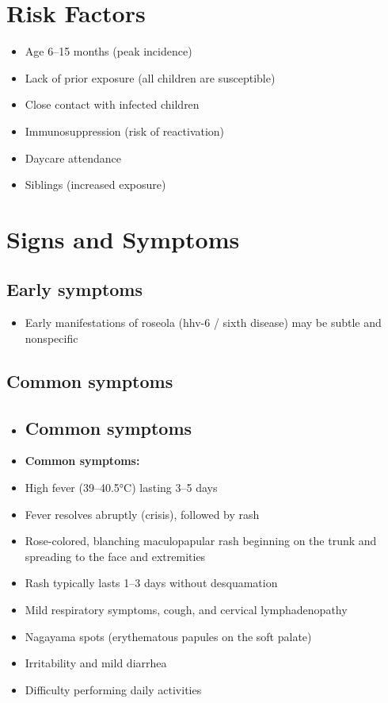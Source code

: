 \section{Risk Factors}

\begin{itemize}[noitemsep]
  \item Age 6--15 months (peak incidence)
  \item Lack of prior exposure (all children are susceptible)
  \item Close contact with infected children
  \item Immunosuppression (risk of reactivation)
  \item Daycare attendance
  \item Siblings (increased exposure)
\end{itemize}

\section{Signs and Symptoms}

\subsection{Early symptoms}
\begin{itemize}[noitemsep]
  \item Early manifestations of roseola (hhv-6 / sixth disease) may be subtle and nonspecific
\end{itemize}

\subsection{Common symptoms}
\begin{itemize}[noitemsep]
  \item \subsection{Common symptoms}
  \item \textbf{Common symptoms:}
  \item High fever (39--40.5°C) lasting 3--5 days
  \item Fever resolves abruptly (crisis), followed by rash
  \item Rose-colored, blanching maculopapular rash beginning on the trunk and spreading to the face and extremities
  \item Rash typically lasts 1--3 days without desquamation
  \item Mild respiratory symptoms, cough, and cervical lymphadenopathy
  \item Nagayama spots (erythematous papules on the soft palate)
  \item Irritability and mild diarrhea
  \item Difficulty performing daily activities
\end{itemize}

